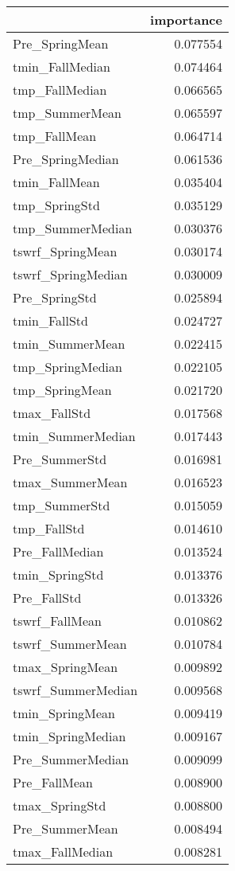 \begin{tabular}{lr}
\toprule
 & importance \\
\midrule
Pre_SpringMean & 0.077554 \\
tmin_FallMedian & 0.074464 \\
tmp_FallMedian & 0.066565 \\
tmp_SummerMean & 0.065597 \\
tmp_FallMean & 0.064714 \\
Pre_SpringMedian & 0.061536 \\
tmin_FallMean & 0.035404 \\
tmp_SpringStd & 0.035129 \\
tmp_SummerMedian & 0.030376 \\
tswrf_SpringMean & 0.030174 \\
tswrf_SpringMedian & 0.030009 \\
Pre_SpringStd & 0.025894 \\
tmin_FallStd & 0.024727 \\
tmin_SummerMean & 0.022415 \\
tmp_SpringMedian & 0.022105 \\
tmp_SpringMean & 0.021720 \\
tmax_FallStd & 0.017568 \\
tmin_SummerMedian & 0.017443 \\
Pre_SummerStd & 0.016981 \\
tmax_SummerMean & 0.016523 \\
tmp_SummerStd & 0.015059 \\
tmp_FallStd & 0.014610 \\
Pre_FallMedian & 0.013524 \\
tmin_SpringStd & 0.013376 \\
Pre_FallStd & 0.013326 \\
tswrf_FallMean & 0.010862 \\
tswrf_SummerMean & 0.010784 \\
tmax_SpringMean & 0.009892 \\
tswrf_SummerMedian & 0.009568 \\
tmin_SpringMean & 0.009419 \\
tmin_SpringMedian & 0.009167 \\
Pre_SummerMedian & 0.009099 \\
Pre_FallMean & 0.008900 \\
tmax_SpringStd & 0.008800 \\
Pre_SummerMean & 0.008494 \\
tmax_FallMedian & 0.008281 \\

\end{tabular}

